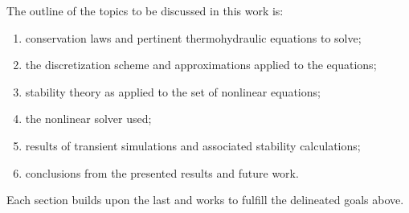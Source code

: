 \documentclass[12pt]{../UWMadThesis}
\begin{document}
The outline of the topics to be discussed in this work is:
\begin{enumerate}[topsep=0pt,parsep=0pt,itemsep=2pt]
    \item{conservation laws and pertinent thermohydraulic equations to solve;}
    \item{the discretization scheme and approximations applied to the equations;}
    \item{stability theory as applied to the set of nonlinear equations;}
    \item{the nonlinear solver used;}
    \item{results of transient simulations and associated stability calculations;}
    \item{conclusions from the presented results and future work.}
\end{enumerate}
Each section builds upon the last and works to fulfill the delineated goals above.






\fi
\end{document}
